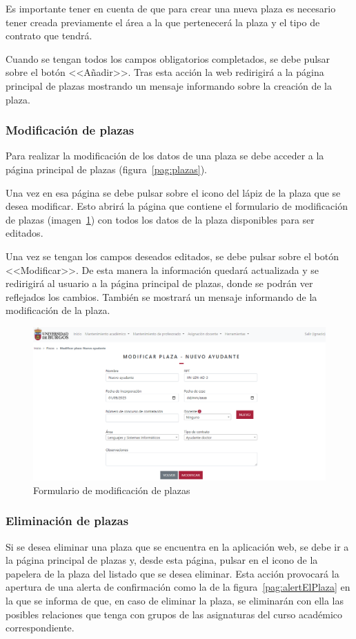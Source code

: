 Es importante tener en cuenta de que para crear una nueva plaza es necesario tener creada previamente el área a la que pertenecerá la plaza y el tipo de contrato que tendrá.

Cuando se tengan todos los campos obligatorios completados, se debe pulsar sobre el botón <<Añadir>>.
Tras esta acción la web redirigirá a la página principal de plazas mostrando un mensaje informando sobre la creación de la plaza.

\subsubsection{Modificación de plazas}
Para realizar la modificación de los datos de una plaza se debe acceder a la página principal de plazas (figura~\ref{pag:plazas}).

Una vez en esa página se debe pulsar sobre el icono del lápiz de la plaza que se desea modificar.
Esto abrirá la página que contiene el formulario de modificación de plazas (imagen~\ref{pag:formModPlaza}) con todos los datos de la plaza disponibles para ser editados.

Una vez se tengan los campos deseados editados, se debe pulsar sobre el botón <<Modificar>>.
De esta manera la información quedará actualizada y se redirigirá al usuario a la página principal de plazas, donde se podrán ver reflejados los cambios. 
También se mostrará un mensaje informando de la modificación de la plaza.

\begin{figure}
	\centering
	\includegraphics[width=\textwidth]{../img/Anexos/Manual usuario/formModPlaza.png}
	\caption{Formulario de modificación de plazas}\label{pag:formModPlaza}
\end{figure}

\subsubsection{Eliminación de plazas}
Si se desea eliminar una plaza que se encuentra en la aplicación web, se debe ir a la página principal de plazas y, desde esta página, pulsar en el icono de la papelera de la plaza del listado que se desea eliminar.
Esta acción provocará la apertura de una alerta de confirmación como la de la figura~\ref{pag:alertElPlaza} en la que se informa de que, en caso de eliminar la plaza, se eliminarán con ella las posibles relaciones que tenga con grupos de las asignaturas del curso académico correspondiente.

